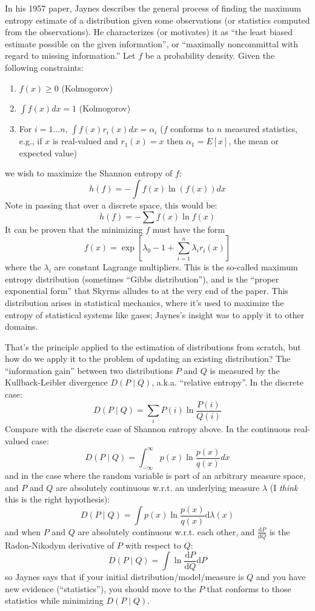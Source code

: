 \documentclass[letterpaper,12pt]{article}
\begin{document}
In his 1957 paper, Jaynes describes the general process of finding the maximum entropy estimate of a distribution given some observations (or statistics computed from the observations). He characterizes (or motivates) it as ``the least biased estimate possible on the given information'', or ``maximally noncommittal with regard to missing information.'' Let $f$ be a probability density. Given the following constraints:
\begin{enumerate}
\item
$f(x) \geq 0$ (Kolmogorov)
\item
$\int f(x) dx = 1$ (Kolmogorov)
\item
For $i = 1 \ldots n$, $\int f(x) r_i(x) dx = \alpha_i$ ($f$ conforms to $n$ measured statistics, e.g., if $x$ is real-valued and $r_1(x) = x$ then $\alpha_1 = E[x]$, the mean or expected value)
\end{enumerate}
we wish to maximize the Shannon entropy of $f$:
$$h(f) = - \int f(x) \ln (f(x)) dx$$
Note in passing that over a discrete space, this would be:
$$h(f) = - \sum f(x) \ln f(x)$$
It can be proven that the minimizing $f$ must have the form
$$f(x) = \exp [\lambda_0 - 1 + \sum_{i=1}^n \lambda_i r_i(x)]$$
where the $\lambda_i$ are constant Lagrange multipliers. This is the so-called maximum entropy distribution (sometimes ``Gibbs distribution''), and is the ``proper exponential form'' that Skyrms alludes to at the very end of the paper. This distribution arises in statistical mechanics, where it's used to maximize the entropy of statistical systems like gases; Jaynes's insight was to apply it to other domains.

That's the principle applied to the estimation of distributions from scratch, but how do we apply it to the problem of updating an existing distribution? The ``information gain'' between two distributions $P$ and $Q$ is measured by the Kullback-Leibler divergence $D(P \mid Q)$, a.k.a. ``relative entropy''. In the discrete case:
$$D(P\mid Q) = \sum_i P(i) \ln \frac{P(i)}{Q(i)}$$
Compare with the discrete case of Shannon entropy above. In the continuous real-valued case:
$$D(P\mid Q) = \int_{-\infty}^\infty p(x) \ln \frac{p(x)}{q(x)} dx$$
and in the case where the random variable is part of an arbitrary measure space, and $P$ and $Q$ are absolutely continuous w.r.t. an underlying measure $\lambda$ (I \emph{think} this is the right hypothesis):
$$D(P\mid Q) = \int p(x) \ln \frac{p(x)}{q(x)} \mathrm{d}\lambda(x)$$
and when $P$ and $Q$ are absolutely continuous w.r.t. each other, and $\frac{\mathrm{d}P}{\mathrm{d}Q}$ is the Radon-Nikodym derivative of $P$ with respect to $Q$:
$$D(P \mid Q) = \int \ln \frac{\mathrm{d}P}{\mathrm{d}Q} \mathrm{d}P$$
so Jaynes says that if your initial distribution/model/measure is $Q$ and you have new evidence (``statistics''), you should move to the $P$ that conforms to those statistics while minimizing $D(P\mid Q)$. 
\end{document}
